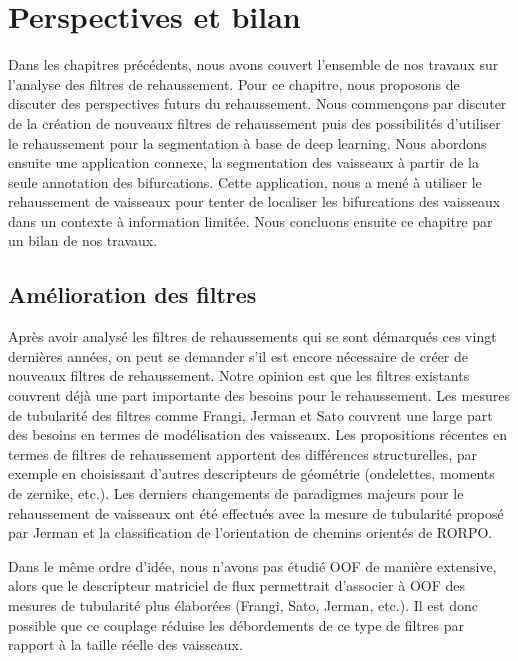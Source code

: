 \chapter{Perspectives et bilan}
\label{sec:Ending}

Dans les chapitres précédents, nous avons couvert l'ensemble de nos travaux sur l'analyse des filtres de rehaussement. Pour ce chapitre, nous proposons de discuter des perspectives futurs du rehaussement. Nous commençons par discuter de la création de nouveaux filtres de rehaussement puis des possibilités d'utiliser le rehaussement pour la segmentation à base de deep learning. Nous abordons ensuite une application connexe, la segmentation des vaisseaux à partir de la seule annotation des bifurcations. Cette application, nous a mené à utiliser le rehaussement de vaisseaux pour tenter de localiser les bifurcations des vaisseaux dans un contexte à information limitée. Nous concluons ensuite ce chapitre par un bilan de nos travaux.
 
\section{Amélioration des filtres}

Après avoir analysé les filtres de rehaussements qui se sont démarqués ces vingt dernières années, on peut se demander s'il est encore nécessaire de créer de nouveaux filtres de rehaussement. Notre opinion est que les filtres existants couvrent déjà une part importante des besoins pour le rehaussement. Les mesures de tubularité des filtres comme Frangi, Jerman et Sato couvrent une large part des besoins en termes de modélisation des vaisseaux. Les propositions récentes en termes de filtres de rehaussement apportent des différences structurelles, par exemple en choisissant d'autres descripteurs de géométrie (ondelettes, moments de zernike, etc.). Les derniers changements de paradigmes majeurs pour le rehaussement de vaisseaux ont été effectués avec la mesure de tubularité proposé par Jerman et la classification de l'orientation de chemins orientés de RORPO.

Dans le même ordre d'idée, nous n'avons pas étudié OOF de manière extensive, alors que le descripteur matriciel de flux permettrait d'associer à OOF des mesures de tubularité plus élaborées (Frangi, Sato, Jerman, etc.). Il est donc possible que ce couplage réduise les débordements de ce type de filtres par rapport à la taille réelle des vaisseaux.

